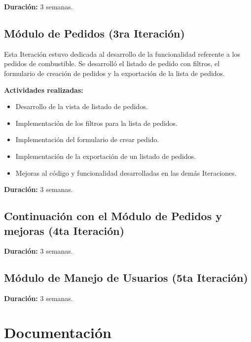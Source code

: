 \textbf{Duración:} 3 semanas.

\subsection{Módulo de Pedidos (3ra Iteración)}
Esta Iteración estuvo dedicada al desarrollo de la funcionalidad referente a los pedidos de combustible. Se desarrolló el listado de pedido con filtros, el formulario de creación de pedidos y la exportación de la lista de pedidos.

\textbf{Actividades realizadas:}
\begin{itemize}
    \item Desarrollo de la vista de listado de pedidos.
    \item Implementación de los filtros para la lista de pedidos.
    \item Implementación del formulario de crear pedido.
    \item Implementación de la exportación de un listado de pedidos.
    \item Mejoras al código y funcionalidad desarrolladas en las demás Iteraciones.
\end{itemize}

\textbf{Duración:} 3 semanas.

\subsection{Continuación con el Módulo de Pedidos y mejoras (4ta Iteración)}

\textbf{Duración:} 3 semanas.

\subsection{Módulo de Manejo de Usuarios (5ta Iteración)}

\textbf{Duración:} 3 semanas.

\section{Documentación}
